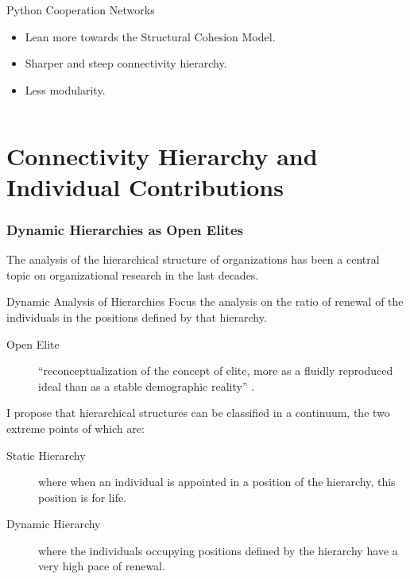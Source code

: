 \documentclass[ignorenonframetext,red,8pt,notes=show]{beamer}
\begin{document}
\begin{frame}
\begin{columns}[c]
\begin{column}{0.5\textwidth}

\begin{block}{Python Cooperation Networks}
\begin{itemize}
\item Lean more towards the Structural Cohesion Model. 
\item Sharper and steep connectivity hierarchy.
\item Less modularity.
\end{itemize}
\end{block}
\end{column}
\end{columns}

\end{frame}


\section{Connectivity Hierarchy and Individual Contributions}

\begin{frame}
\frametitle{Dynamic Hierarchies as Open Elites}

The analysis of the hierarchical structure of organizations has been a central topic on organizational research in the last decades.

\begin{block}{Dynamic Analysis of Hierarchies}
Focus the analysis on the ratio of renewal of the individuals in the positions defined by that hierarchy.

\begin{description}
\item[Open Elite] ``reconceptualization of the concept of elite, more as a fluidly reproduced ideal than as a stable demographic reality'' \citep[360]{padgett:2010}.
\end{description}

\end{block}

\vspace{0.5cm}

I propose that hierarchical structures can be classified in a continuum, the two extreme points of which are: 

\begin{description}
\item[Static Hierarchy] where when an individual is appointed in a position of the hierarchy, this position is for life.
\item[Dynamic Hierarchy] where the individuals occupying positions defined by the hierarchy have a very high pace of renewal.
\end{description}

\end{frame}
\end{document}
